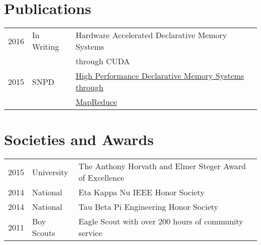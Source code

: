 \documentclass[letterpaper]{deedy-resume} %
\begin{document}
\begin{minipage}[t]{0.66\textwidth}
\sectionspace %



\section{Publications} 

\begin{tabular}{rll}
2016 	 & In Writing  & Hardware Accelerated Declarative Memory Systems \\
 		 & 			   & through CUDA\\
2015	 & SNPD   & \href{http://ieeexplore.ieee.org/xpl/articleDetails.jsp?arnumber=7176183}{High Performance Declarative Memory Systems through}\\
 		 & 			   & \href{http://ieeexplore.ieee.org/xpl/articleDetails.jsp?arnumber=7176183}{MapReduce}
\end{tabular}

\sectionspace %


\section{Societies and Awards} 

\begin{tabular}{rll}
2015 & University & The Anthony Horvath and Elmer Steger Award of Excellence \\
2014 & National & Eta Kappa Nu IEEE Honor Society\\
2014 & National & Tau Beta Pi Engineering Honor Society\\
2011 & Boy Scouts & Eagle Scout with over 200 hours of community service\\
\end{tabular}

\sectionspace %


\end{minipage} %
\end{document}
